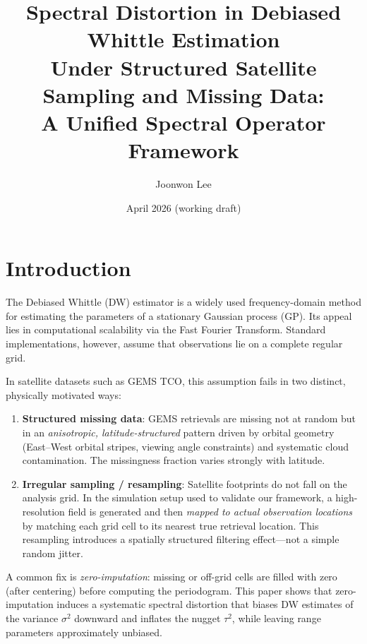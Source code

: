 \documentclass[12pt]{article}
\title{Spectral Distortion in Debiased Whittle Estimation\\
Under Structured Satellite Sampling and Missing Data:\\
A Unified Spectral Operator Framework}
\author{Joonwon Lee}
\date{April 2026 (working draft)}
\begin{document}
\maketitle
\tableofcontents
\bigskip

\section{Introduction}

The Debiased Whittle (DW) estimator \citep{Sykulski2019} is a widely used
frequency-domain method for estimating the parameters of a stationary
Gaussian process (GP).  Its appeal lies in computational scalability via
the Fast Fourier Transform.  Standard implementations, however, assume
that observations lie on a complete regular grid.

In satellite datasets such as GEMS TCO, this assumption fails in two
distinct, physically motivated ways:
\begin{enumerate}
  \item \textbf{Structured missing data}: GEMS retrievals are missing not
        at random but in an \emph{anisotropic, latitude-structured} pattern
        driven by orbital geometry (East--West orbital stripes, viewing
        angle constraints) and systematic cloud contamination.
        The missingness fraction varies strongly with latitude.
  \item \textbf{Irregular sampling / resampling}: Satellite footprints do
        not fall on the analysis grid.
        In the simulation setup used to validate our framework,
        a high-resolution field is generated and then \emph{mapped to
        actual observation locations} by matching each grid cell to its
        nearest true retrieval location.
        This resampling introduces a spatially structured filtering
        effect---not a simple random jitter.
\end{enumerate}
A common fix is \emph{zero-imputation}: missing or off-grid cells are
filled with zero (after centering) before computing the periodogram.
This paper shows that zero-imputation induces a systematic spectral
distortion that biases DW estimates of the variance $\sigma^2$ downward
and inflates the nugget $\tau^2$, while leaving range parameters
approximately unbiased.
\end{document}
